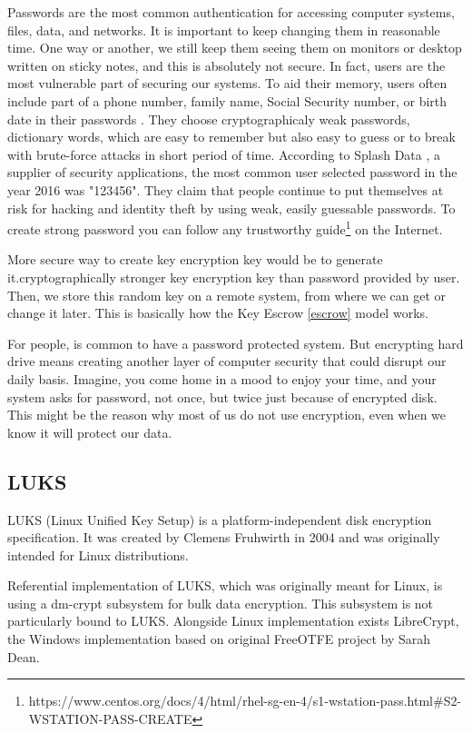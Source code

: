 Passwords are the most common authentication for accessing computer systems, files, data, and networks. 
It is important to keep changing them in reasonable time. 
One way or another, we still keep them seeing them on monitors or desktop written on sticky notes, and this is absolutely not secure. 
In fact, users are the most vulnerable part of securing our systems.
To aid their memory, users often include part of a phone number, family name, Social Security number, or birth date in their passwords \cite{pwdsec}.
They choose cryptographicaly weak passwords, dictionary words, which are easy to remember but also easy to guess or to break with brute-force attacks in short period of time.
According to Splash Data \cite{splashdata}, a supplier of security applications, the most common user selected password in the year 2016 was "123456". 
They claim that people continue to put themselves at risk for hacking and identity theft by using weak, easily guessable passwords.
To create strong password you can follow any trustworthy guide\footnote{https://www.centos.org/docs/4/html/rhel-sg-en-4/s1-wstation-pass.html\#S2-WSTATION-PASS-CREATE} on the Internet.

More secure way to create key encryption key would be to generate it.cryptographically stronger key encryption key than password provided by user.
Then, we store this random key on a remote system, from where we can get or change it later.
This is basically how the Key Escrow \ref{escrow} model works.

For people, is common to have a password protected system.
But encrypting hard drive means creating another layer of computer security that could disrupt our daily basis.
Imagine, you come home in a mood to enjoy your time, and your system asks for password, not once, but twice just because of encrypted disk.
This might be the reason why most of us do not use encryption, even when we know it will protect our data.

\subsection{LUKS}

LUKS (Linux Unified Key Setup) is a platform-independent disk encryption specification. 
It was created by Clemens Fruhwirth in 2004 and was originally intended for Linux distributions.

Referential implementation of LUKS, which was originally meant for Linux, is using a dm-crypt subsystem for bulk data encryption.
This subsystem is not particularly bound to LUKS.
Alongside Linux implementation exists LibreCrypt, the Windows implementation based on original FreeOTFE \cite{FreeOTFE} project by Sarah Dean.

